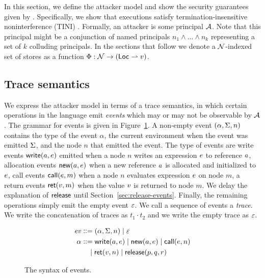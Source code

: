 In this section, we define the attacker model and show the security guarantees given by \lang. Specifically, we show that \lang{} executions satisfy termination-insensitive noninterference (TINI) \cite{4223226}. Formally, an attacker is some principal $\mathcal{A}$. Note that this principal might be a conjunction of named principals $n_1 \wedge \dots \wedge n_k$ representing a set of $k$ colluding principals. In the sections that follow we denote a $\mathcal{N}$-indexed set of stores as a function $\Phi: \mathcal{N} \to (\mathsf{Loc} \rightharpoonup v)$.

\subsection{Trace semantics}
We express the attacker model in terms of a trace semantics, in which certain operations in the language emit \emph{events} which may or may not be observable by $\mathcal{A}$. The grammar for events is given in Figure~\ref{fig:event-syntax}. A non-empty event $(\alpha, \Sigma, n)$ contains the type of the event $\alpha$, the current environment when the event was emitted $\Sigma$, and the node $n$ that emitted the event. The type of events are write events $\mathsf{write}(a, e)$ emitted when a node $n$ writes an expression $e$ to reference $a$, allocation events $\mathsf{new}(a, e)$ when a new reference $a$ is allocated and initialized to $e$, call events $\mathsf{call}(e, m)$ when a node $n$ evaluates expression $e$ on node $m$, a return events $\mathsf{ret}(v, m)$ when the value $v$ is returned to node $m$. We delay the explanation of $\mathsf{release}$ until Section~\ref{sec:release-events}. Finally, the remaining operations simply emit the empty event $\varepsilon$. We call a sequence of events a \emph{trace}. We write the concatenation of traces as $t_1 \cdot t_2$ and we write the empty trace as $\varepsilon$.

\begin{figure}
\centering
\begin{align*}
\mathit{ev} &\vcentcolon\vcentcolon= (\alpha, \Sigma, n) \mid \varepsilon\\
\alpha &\vcentcolon\vcentcolon= \mathsf{write}(a, e) \mid \mathsf{new}(a, e) \mid \mathsf{call}(e, n) \\ &\quad \mid \mathsf{ret}(v, n) \mid \mathsf{release}(p, q, r)
\end{align*}
\caption{The syntax of events.}
\label{fig:event-syntax}
\end{figure}

